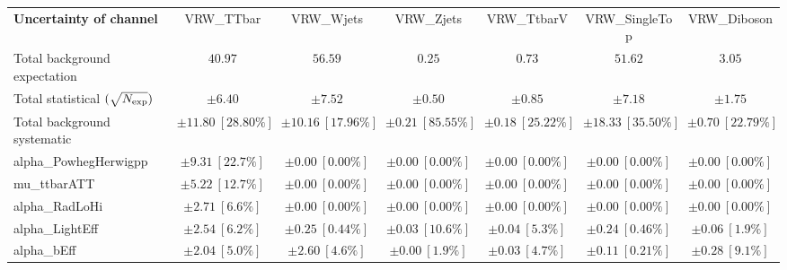 
\begin{sidewaystable}
\begin{center}
\setlength{\tabcolsep}{0.0pc}
\begin{tabular*}{\textwidth}{@{\extracolsep{\fill}}lcccccc}
\noalign{\smallskip}\hline\noalign{\smallskip}
{\bf Uncertainty of channel}                                    & VRW\_TTbar            & VRW\_Wjets            & VRW\_Zjets            & VRW\_TtbarV            & VRW\_SingleTop            & VRW\_Diboson            \\
\noalign{\smallskip}\hline\noalign{\smallskip}
Total background expectation             &  $40.97$        &  $56.59$        &  $0.25$        &  $0.73$        &  $51.62$        &  $3.05$       \\
\noalign{\smallskip}\hline\noalign{\smallskip}
Total statistical $(\sqrt{N_{\rm exp}})$              & $\pm 6.40$        & $\pm 7.52$        & $\pm 0.50$        & $\pm 0.85$        & $\pm 7.18$        & $\pm 1.75$       \\
Total background systematic               & $\pm 11.80\ [28.80\%] $        & $\pm 10.16\ [17.96\%] $        & $\pm 0.21\ [85.55\%] $        & $\pm 0.18\ [25.22\%] $        & $\pm 18.33\ [35.50\%] $        & $\pm 0.70\ [22.79\%] $             \\
\noalign{\smallskip}\hline\noalign{\smallskip}
\noalign{\smallskip}\hline\noalign{\smallskip}
alpha\_PowhegHerwigpp         & $\pm 9.31\ [22.7\%] $          & $\pm 0.00\ [0.00\%] $          & $\pm 0.00\ [0.00\%] $          & $\pm 0.00\ [0.00\%] $          & $\pm 0.00\ [0.00\%] $          & $\pm 0.00\ [0.00\%] $       \\
mu\_ttbarATT         & $\pm 5.22\ [12.7\%] $          & $\pm 0.00\ [0.00\%] $          & $\pm 0.00\ [0.00\%] $          & $\pm 0.00\ [0.00\%] $          & $\pm 0.00\ [0.00\%] $          & $\pm 0.00\ [0.00\%] $       \\
alpha\_RadLoHi         & $\pm 2.71\ [6.6\%] $          & $\pm 0.00\ [0.00\%] $          & $\pm 0.00\ [0.00\%] $          & $\pm 0.00\ [0.00\%] $          & $\pm 0.00\ [0.00\%] $          & $\pm 0.00\ [0.00\%] $       \\
alpha\_LightEff         & $\pm 2.54\ [6.2\%] $          & $\pm 0.25\ [0.44\%] $          & $\pm 0.03\ [10.6\%] $          & $\pm 0.04\ [5.3\%] $          & $\pm 0.24\ [0.46\%] $          & $\pm 0.06\ [1.9\%] $       \\
alpha\_bEff         & $\pm 2.04\ [5.0\%] $          & $\pm 2.60\ [4.6\%] $          & $\pm 0.00\ [1.9\%] $          & $\pm 0.03\ [4.7\%] $          & $\pm 0.11\ [0.21\%] $          & $\pm 0.28\ [9.1\%] $       \\

\end{tabular*}
\end{center}
\end{sidewaystable}
